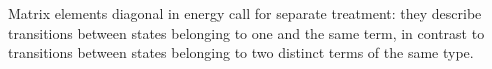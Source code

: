 Matrix elements diagonal in energy call for separate treatment: they describe transitions between states belonging to one and the same term, in contrast to transitions between states belonging to two distinct terms of the same type.
